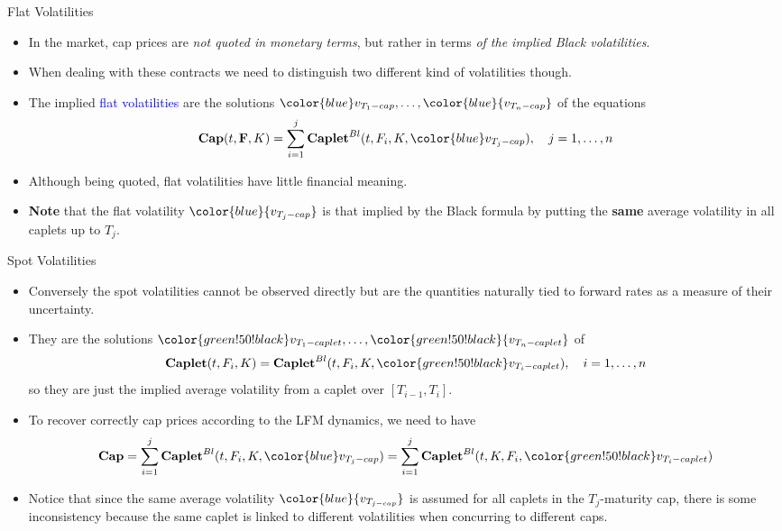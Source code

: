 \documentclass{beamer}
\begin{document}
\begin{frame}{Flat Volatilities}
	\begin{itemize}
		\item<1-> In the market, cap prices are \emph{not quoted in monetary terms}, but rather in terms \emph{of the implied Black volatilities}.
		\item<1-> When dealing with these contracts we need to distinguish two different kind of volatilities though.
		\item<2-> The implied \textcolor{blue}{flat volatilities} are the solutions ${\color{blue}v_{T_1-cap}},\ldots, \color{blue}{v_{T_n-cap}}$ of the equations
		\begin{equation*}
			\textbf{Cap}(t,\mathbf{F}, K) = \sum_{i=1}^j \textbf{Caplet}^{Bl}(t, F_i, K,{\color{blue}v_{T_j-cap}}),\quad j=1, \ldots,n
		\end{equation*}
		\item<3-> Although being quoted, \textcolor{maincolor}{flat volatilities have little financial meaning}.
		\item<3-> \textbf{Note} that the flat volatility $\color{blue}{v_{T_j-cap}}$ is that implied by the Black formula by putting the \textbf{same} average volatility in all caplets up to $T_j$.
	\end{itemize}
\end{frame}

\begin{frame}{Spot Volatilities}
	\begin{itemize}
		\item<1-> Conversely the \textcolor{green!50!black}{spot volatilities} cannot be observed directly but are the quantities \textcolor{maincolor}{naturally tied to forward rates as a measure of their uncertainty}.
		\item<1-> They are the solutions ${\color{green!50!black}v_{T_1-caplet}},\ldots, \color{green!50!black}{v_{T_n-caplet}}$ of
		\begin{equation*}
			\textbf{Caplet}(t,F_i,K) = \textbf{Caplet}^{Bl}(t, F_i, K,{\color{green!50!black}v_{T_i-caplet}}),\quad i=1, \ldots,n
		\end{equation*}
		so they are just the implied average volatility from a caplet over $[T_{i-1}, T_i]$.
		\item<2-> To recover correctly cap prices according to the LFM dynamics, we need to have
		\begin{equation}
			\textbf{Cap} = \sum_{i=1}^j\textbf{Caplet}^{Bl}(t,F_i, K,{\color{blue}v_{T_j-cap}}) = \sum_{i=1}^j\textbf{Caplet}^{Bl}(t,K,F_i,{\color{green!50!black}v_{T_i-caplet}})
			\label{eq:spot_flat_vola}
		\end{equation}
		\item<3-> Notice that since the same average volatility $\color{blue}{v_{T_{j-cap}}}$ is assumed for all caplets in the $T_j$-maturity cap, there is some inconsistency because the same caplet is linked to different volatilities when concurring to different caps.
	\end{itemize}
\end{frame}
\end{document}
